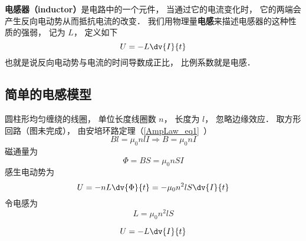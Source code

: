 

\textbf{电感器（inductor）}是电路中的一个元件， 当通过它的电流变化时， 它的两端会产生反向电动势从而抵抗电流的改变． 我们用物理量\textbf{电感}来描述电感器的这种性质的强弱， 记为 $L$， 定义如下
\begin{equation}
U = -L\dv{I}{t}
\end{equation}
也就是说反向电动势与电流的时间导数成正比， 比例系数就是电感．

\subsection{简单的电感模型}



圆柱形均匀缠绕的线圈， 单位长度线圈数 $n$， 长度为 $l$， 忽略边缘效应． 取方形回路（图未完成）， 由安培环路定理（\autoref{AmpLaw_eq1}~）
\begin{equation}
Bl = \mu_0nlI \Rightarrow B = \mu_0nI
\end{equation}
磁通量为
\begin{equation}
\Phi = BS = \mu_0nSI
\end{equation}
感生电动势为
\begin{equation}
U = -nL\dv{\Phi}{t} = -\mu_0n^2lS \dv{I}{t}
\end{equation}
令电感为
\begin{equation}
L = \mu_0n^2lS
\end{equation}

\begin{equation}
U = -L\dv{I}{t}
\end{equation}
